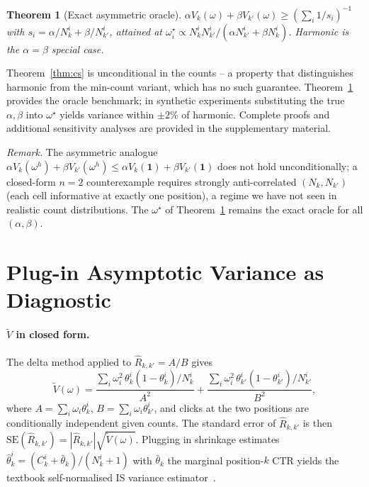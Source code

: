 \documentclass[sigconf]{acmart}
\newtheorem{theorem}{Theorem}
\begin{document}
\begin{theorem}[Exact asymmetric oracle]
\label{thm:asym}
$\alpha V_k(\omega)+\beta V_{k'}(\omega)\ge(\sum_i 1/s_i)^{-1}$ with
$s_i=\alpha/N_k^i+\beta/N_{k'}^i$, attained at
$\omega_i^\star\propto N_k^i N_{k'}^i/(\alpha N_{k'}^i+\beta N_k^i)$.
Harmonic is the $\alpha=\beta$ special case.
\end{theorem}

Theorem~\ref{thm:cs} is unconditional in the counts -- a property
that distinguishes harmonic from the min-count variant, which has no
such guarantee. Theorem~\ref{thm:asym} provides the oracle
benchmark; in synthetic experiments substituting the true $\alpha,\beta$ into
$\omega^\star$ yields variance within $\pm 2\%$ of harmonic. Complete
proofs and additional sensitivity analyses are provided in the
supplementary material.

\emph{Remark.} The asymmetric analogue
$\alpha V_k(\omega^h)+\beta V_{k'}(\omega^h)\le \alpha V_k(\mathbf 1)+\beta V_{k'}(\mathbf 1)$
does not hold unconditionally; a closed-form $n=2$ counterexample
requires strongly anti-correlated $(N_k,N_{k'})$ (each cell informative
at exactly one position), a regime we have not seen in realistic
count distributions. The $\omega^\star$ of Theorem~\ref{thm:asym}
remains the exact oracle for all $(\alpha,\beta)$.

\section{Plug-in Asymptotic Variance as Diagnostic}
\label{sec:plugin}

\paragraph{$\widetilde V$ in closed form.}
The delta method applied to $\hat R_{k,k'}=A/B$ gives
\begin{equation}
\widetilde V(\omega)=\frac{\sum_i\omega_i^2\,\theta_k^i(1-\theta_k^i)/N_k^i}{A^2}
+\frac{\sum_i\omega_i^2\,\theta_{k'}^i(1-\theta_{k'}^i)/N_{k'}^i}{B^2},
\label{eq:Vtilde}
\end{equation}
where $A = \sum_i \omega_i \theta_k^i$, $B = \sum_i \omega_i \theta_{k'}^i$,
and clicks at the two positions are conditionally independent given counts.
The standard error of $\hat R_{k,k'}$ is then
$\mathrm{SE}(\hat R_{k,k'})=|\hat R_{k,k'}|\sqrt{\widetilde V(\omega)}$.
Plugging in shrinkage estimates
$\hat\theta_k^i=(C_k^i+\bar\theta_k)/(N_k^i+1)$ with $\bar\theta_k$ the
marginal position-$k$ CTR yields the textbook self-normalised IS variance
estimator~\cite{owen2013mc,kong1992ess,swaminathan2015snips}.
\end{document}
